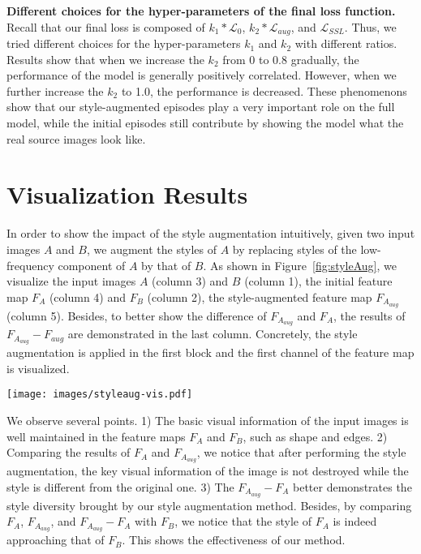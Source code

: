 \documentclass{article}
\begin{document}
	\noindent\textbf{Different choices for the hyper-parameters of the final loss function.} Recall that our final loss is composed of $k_1 * \mathcal{L}_0$, $k_2 * \mathcal{L}_{aug}$, and $\mathcal{L}_{SSL}$. Thus, we tried different choices for the hyper-parameters $k_1$ and $k_2$ with different ratios. Results show that when we increase the $k_2$ from 0 to 0.8 gradually, the performance of the model is generally positively correlated. However, when we further increase the $k_2$ to 1.0, the performance is decreased. These phenomenons show that our style-augmented episodes play a very important role on the full model, while the initial episodes still contribute by showing the model what the real source images look like.




\section{Visualization Results}
In order to show the impact of the style augmentation intuitively, given two input images $A$ and $B$, we augment the styles of $A$ by replacing styles of the low-frequency component of $A$ by that of $B$. As shown in Figure~\ref{fig:styleAug}, we visualize the input images $A$ (column 3) and $B$ (column 1), the initial feature map $F_A$ (column 4) and $F_B$ (column 2), the style-augmented feature map $F_{A_{aug}}$ (column 5). Besides, to better show the difference of $F_{A_{aug}}$ and $F_A$, the results of $F_{A_{aug}} - F_{aug}$ are demonstrated in the last column.  Concretely, the style augmentation is applied in the first block and the first channel of the feature map is visualized. 

\begin{figure*}[h]
	\centering
	\texttt{[image: images/styleaug-vis.pdf]}
\caption{\textbf{The visualization of our style augmentation.} Given two images $A$ and $B$, the input images, the initial feature map $F_A$ and $F_B$, the style-augmented feature map $F_{A_{aug}}$ which is obtained by replacing the style of $F_A$ by that of $F_B$, and the results of $F_{A_{aug}} - F_A$ are displayed. Totally, five images randomly sampled from the mini-Imagenet are given.}
	\label{fig:styleAug} 
\end{figure*}

 
We observe several points. 1) The basic visual information of the input images is well maintained in the feature maps $F_A$ and $F_B$, such as shape and edges. 2) Comparing the results of $F_A$ and $F_{A_{aug}}$, we notice that after performing the style augmentation, the key visual information of the image is not destroyed while the style is different from the original one. 3) The $F_{A_{aug}} - F_{A}$ better demonstrates the style diversity brought by our style augmentation method. Besides, by comparing $F_A$, $F_{A_{aug}}$, and $F_{A_{aug}} - F_A$ with $F_{B}$, we notice that the style of $F_A$ is indeed approaching that of $F_B$. This shows the effectiveness of our method.
\end{document}
